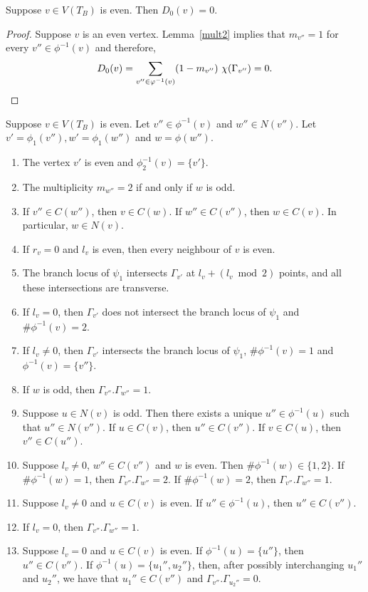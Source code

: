 \begin{lemma}\label{evenfirst}
 Suppose $v \in V(T_B)$ is even. Then $ D_0(v) = 0 $.
\end{lemma}
\begin{proof}
Suppose $v$ is an even vertex. Lemma~\ref{mult2} implies that $m_{v''} = 1$ for every $v'' \in \phi^{-1}(v)$ and therefore,
\[ D_0(v) = \sum_{v'' \in \phi^{-1}(v)} (1-m_{v''})\ \chi(\Gamma_{v''}) = 0 . \qedhere \]
\end{proof}

\begin{lemma}\label{evenprelim}
Suppose $v \in V(T_B)$ is even. Let $v'' \in \phi^{-1}(v)$ and $w'' \in N(v'')$. Let $v' = \phi_1(v''), w' = \phi_1(w'')$ and $w = \phi(w'')$. 
\begin{enumerate}[\upshape (a)]
 \item The vertex $v'$ is even and $\phi_2^{-1}(v) = \{ v' \}$.
 \item The multiplicity $m_{w''} = 2$ if and only if $w$ is odd.
 \item If $v'' \in C(w'')$, then $v \in C(w)$. If $w'' \in C(v'')$, then $w \in C(v)$. In particular, $w \in N(v)$.
 \item If $r_v = 0$ and $l_v$ is even, then every neighbour of $v$ is even.
 \item The branch locus of $\psi_1$ intersects $\Gamma_{v'}$ at $l_v+(l_v \bmod 2)$ points, and all these intersections are transverse.
 \item If $l_v = 0$, then $\Gamma_{v'}$ does not intersect the branch locus of $\psi_1$ and $\# \phi^{-1}(v) = 2$. 
 \item If $l_v \neq 0$, then $\Gamma_{v'}$ intersects the branch locus of $\psi_1$, $\# \phi^{-1}(v) = 1$ and $\phi^{-1}(v) = \{ v'' \}$.
 \item If $w$ is odd, then $\Gamma_{v''}.\Gamma_{w''} = 1$.
 \item Suppose $u \in N(v)$ is odd. Then there exists a unique $u'' \in \phi^{-1}(u)$ such that $u'' \in N(v'')$. If $u \in C(v)$, then $u'' \in C(v'')$. If $v \in C(u)$, then $v'' \in C(u'')$.
 \item Suppose $l_v \neq 0$, $w'' \in C(v'')$ and $w$ is even. Then  $\# \phi^{-1}(w) \in \{1,2\}$. If $\# \phi^{-1}(w) = 1$, then  $\Gamma_{v''}.\Gamma_{w''} = 2$. If $\# \phi^{-1}(w) = 2$, then $\Gamma_{v''}.\Gamma_{w''} = 1$.
 \item Suppose $l_v \neq 0$ and $u \in C(v)$ is even. If $u'' \in \phi^{-1}(u)$, then $u'' \in C(v'')$. 
 \item If $l_v = 0$, then $\Gamma_{v''}.\Gamma_{w''} = 1$.
 \item Suppose $l_v = 0$ and $u \in C(v)$ is even. If $\phi^{-1}(u) = \{ u'' \}$, then $u'' \in C(v'')$. If $\phi^{-1}(u) = \{ u_1'',u_2'' \}$, then, after possibly interchanging $u_1''$ and $u_2''$, we have that
 $u_1'' \in C(v'')$ and $\Gamma_{v''}.\Gamma_{u_2''} = 0$. 
\end{enumerate}
\end{lemma}
